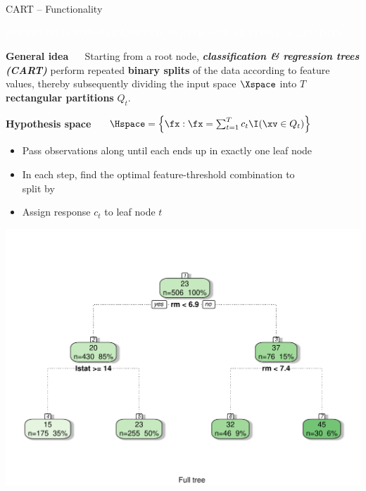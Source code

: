 \documentclass[11pt,compress,t,notes=noshow, xcolor=table]{beamer}
\newcommand{\bfit}[1]{\textbf{\textit{#1}}}
\newcommand{\maketag}[1]{\colorbox{highlightcol}{\textcolor{white}
{\MakeUppercase{#1}}}}
\newcommand{\highlight}[1]{\textcolor{highlightcol}{\textbf{#1}}}
\begin{document}
\begin{frame}{CART -- Functionality}

\footnotesize

\maketag{Supervised}
\maketag{Non-parametric}
\maketag{White-box}
\maketag{Feature selection}

\medskip

\highlight{General idea} ~~ Starting from a root node, 
\bfit{classification \& regression trees (CART)} 
perform repeated \textbf{binary splits} of the data according to feature values, 
thereby subsequently dividing the input space $\Xspace$ into $T$ 
\textbf{rectangular partitions} $Q_t$.

\medskip
 
\highlight{Hypothesis space} ~~
$\Hspace = \left\{ \fx: \fx = \sum_{t = 1}^T c_t \I(\xv \in Q_t) 
\right\}$

\medskip

\begin{minipage}{0.6\textwidth}
  \begin{itemize}
    \item Pass observations along until each ends up in exactly 
    one leaf node
    \item In each step, find the optimal feature-threshold
    combination to \\ split by
  \item Assign response $c_t$ to leaf node $t$
\end{itemize}

\end{minipage}%
\begin{minipage}{0.4\textwidth}
  \includegraphics[width=\textwidth]{figure/cart.pdf}
\end{minipage}

\end{frame}
\end{document}
